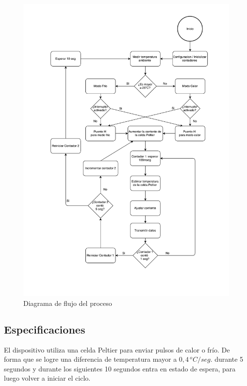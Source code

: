 \documentclass[10pt,spanish,a4paper,openany,notitlepage]{article}
\begin{document}
\begin{figure}[H] %
\begin{center}
\includegraphics[scale=0.55]{./imagenes/diagrama_de_flujo.pdf}
\caption{Diagrama de flujo del proceso}
 \label{fig:diag_flujo}
\end{center}
\end{figure}


\subsection{Especificaciones}

El dispositivo utiliza una celda Peltier para enviar pulsos de calor
o frío. De forma que se logre una diferencia de temperatura mayor a $0,4\, \unit{^oC/seg.}$
durante 5 segundos y durante los siguientes 10 segundos entra
en estado de espera, para luego volver a iniciar el ciclo. 
\end{document}
